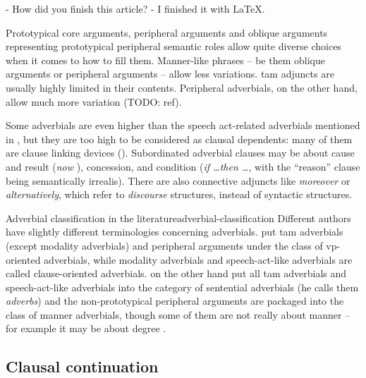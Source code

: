 \documentclass[UTF8, a4paper, oneside, scheme=plain]{ctexrep}
\newcommand*{\citepage}[1]{p.~{#1}}
\newcommand*{\term}[1]{\emph{#1}}
\newcommand{\corpus}[1]{\emph{#1}}
\begin{document}
\begin{exe}
    \ex\label{ex:simple-clause.dependents.ex-3} - How did you finish this article? 
    - I finished it with LaTeX.
\end{exe}

Prototypical core arguments,
peripheral arguments and oblique arguments representing prototypical peripheral semantic roles 
allow quite diverse choices when it comes to how to fill them.
Manner-like phrases -- be them oblique arguments or peripheral arguments -- 
allow less variations.
\acs{tam} adjuncts are usually highly limited in their contents.
Peripheral adverbials, on the other hand,
allow much more variation (TODO: ref).




Some adverbials are even higher than the speech act-related adverbials 
mentioned in ,
but they are too high to be considered as clausal dependents:
many of them are clause linking devices ().
Subordinated adverbial clauses may be about 
cause and result (\corpus{now }), 
concession, 
and condition (\corpus{if \dots then \dots}, with the ``reason'' clause being semantically irrealis).
There are also connective adjuncts like \corpus{moreover} or \corpus{alternatively},
which refer to \emph{discourse} structures, instead of syntactic structures.

\begin{infobox}{Adverbial classification in the literature}{adverbial-classification}
    Different authors have slightly different terminologies concerning adverbials.
    \citet[\citepage{576}]{cgel} put \acs{tam} adverbials (except modality adverbials) 
    and peripheral arguments
    under the class of \acs{vp}-oriented adverbials, 
    while modality adverbials and speech-act-like adverbials are called clause-oriented adverbials.
    \citet[\citepage{386}]{dixon2005semantic} on the other hand 
    put all \acs{tam} adverbials and speech-act-like adverbials 
    into the category of sentential adverbials (he calls them \term{adverbs})
    and the non-prototypical peripheral arguments are packaged into the class of manner adverbials,
    though some of them are not really about manner -- 
    for example it may be about degree \citet[\citepage{576}]{cgel}.
\end{infobox}

\subsection{Clausal continuation}
\end{document}
